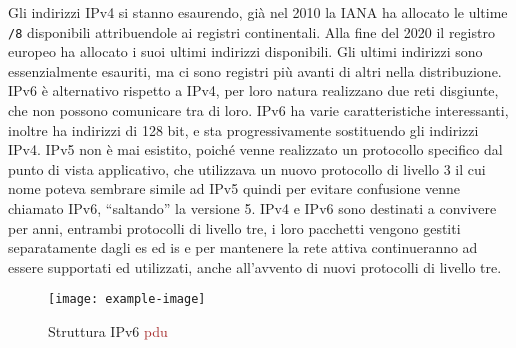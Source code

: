 \documentclass{article}
\numberwithin{equation}{subsection}
\begin{document}
Gli indirizzi \textcolor{BurntOrange}{IPv4} si stanno esaurendo, già nel 2010 la IANA ha allocato le ultime \verb|/8| disponibili attribuendole ai registri continentali. Alla fine del 2020 il registro 
europeo ha allocato i suoi ultimi indirizzi disponibili. Gli ultimi indirizzi sono essenzialmente esauriti, ma ci sono registri più avanti di altri nella 
distribuzione. \textcolor{OliveGreen}{IPv6} è alternativo rispetto a \textcolor{BurntOrange}{IPv4}, per loro natura realizzano due reti disgiunte, che non possono comunicare tra di loro. \textcolor{OliveGreen}{IPv6} ha varie 
caratteristiche interessanti, inoltre ha indirizzi di 128 bit, e sta progressivamente sostituendo gli indirizzi \textcolor{BurntOrange}{IPv4}. 
IPv5 non è mai esistito, poiché venne realizzato un protocollo specifico dal punto di vista applicativo, che utilizzava un nuovo protocollo di livello 3 il cui nome 
poteva sembrare simile ad IPv5 quindi per evitare confusione venne chiamato \textcolor{OliveGreen}{IPv6}, ``saltando'' la versione 5. 
\textcolor{BurntOrange}{IPv4} e \textcolor{OliveGreen}{IPv6} sono destinati a convivere per anni, entrambi protocolli di livello tre, i loro pacchetti vengono gestiti separatamente dagli \textcolor{Periwinkle}{es} ed \textcolor{Emerald}{is} e per mantenere la rete attiva continueranno ad essere supportati ed utilizzati, anche all'avvento di nuovi protocolli di livello tre. 

\begin{figure}[H]%
    \centering%
    \texttt{[image: example-image]}%
    \caption{Struttura \textcolor{OliveGreen}{IPv6} \textcolor{Brown}{pdu}}%
\end{figure}
\end{document}
